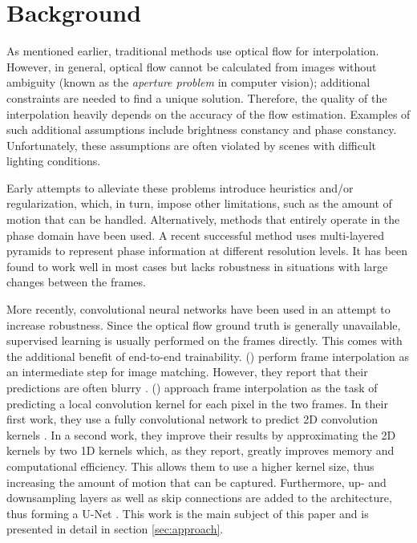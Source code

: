 \documentclass[10pt,twocolumn,letterpaper]{article}
\newcommand{\citay}[1][]{\citeauthor{#1} (\citeyear{#1})}
\begin{document}
\section{Background}
\label{sec:related_work}
As mentioned earlier, traditional methods use optical flow for interpolation. However, in general, optical flow cannot be calculated from images without ambiguity (known as the \textit{aperture problem} in computer vision); additional constraints are needed to find a unique solution. Therefore, the quality of the interpolation heavily depends on the accuracy of the flow estimation. Examples of such additional assumptions include brightness constancy and phase constancy. Unfortunately, these assumptions are often violated by scenes with difficult lighting conditions.

Early attempts to alleviate these problems introduce heuristics and/or regularization, which, in turn, impose other limitations, such as the amount of motion that can be handled. Alternatively, methods that entirely operate in the phase domain have been used. A recent successful method \cite{PhaseBased} uses multi-layered pyramids to represent phase information at different resolution levels. It has been found to work well in most cases but lacks robustness in situations with large changes between the frames.

More recently, convolutional neural networks have been used in an attempt to increase robustness.
Since the optical flow ground truth is generally unavailable, supervised learning is usually performed on the frames directly. This comes with the additional benefit of end-to-end trainability. \citay[ImageMatching] perform frame interpolation as an intermediate step for image matching. However, they report that their predictions are often blurry \cite{ImageMatching}. \citay[AdapConv] approach frame interpolation as the task of predicting a local convolution kernel for each pixel in the two frames. In their first work, they use a fully convolutional network to predict 2D convolution kernels \cite{AdapConv}. In a second work, they improve their results by approximating the 2D kernels by two 1D kernels which, as they report, greatly improves memory and computational efficiency. This allows them to use a higher kernel size, thus increasing the amount of motion that can be captured. Furthermore, up- and downsampling layers as well as skip connections are added to the architecture, thus forming a U-Net \cite{SepConv}. This work is the main subject of this paper and is presented in detail in section \ref{sec:approach}.
\end{document}
